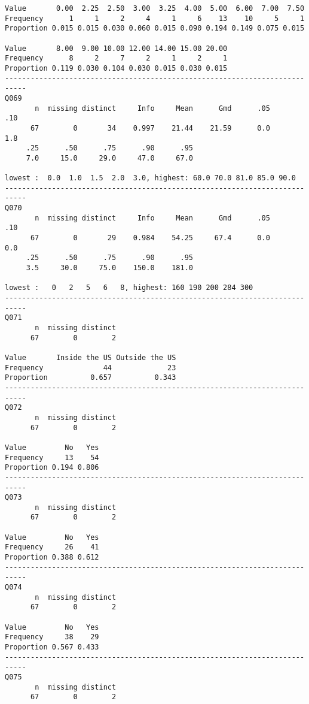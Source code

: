 \documentclass[]{article}
\begin{document}
\begin{verbatim}
Value       0.00  2.25  2.50  3.00  3.25  4.00  5.00  6.00  7.00  7.50
Frequency      1     1     2     4     1     6    13    10     5     1
Proportion 0.015 0.015 0.030 0.060 0.015 0.090 0.194 0.149 0.075 0.015
                                                    
Value       8.00  9.00 10.00 12.00 14.00 15.00 20.00
Frequency      8     2     7     2     1     2     1
Proportion 0.119 0.030 0.104 0.030 0.015 0.030 0.015
---------------------------------------------------------------------------
Q069 
       n  missing distinct     Info     Mean      Gmd      .05      .10 
      67        0       34    0.997    21.44    21.59      0.0      1.8 
     .25      .50      .75      .90      .95 
     7.0     15.0     29.0     47.0     67.0 

lowest :  0.0  1.0  1.5  2.0  3.0, highest: 60.0 70.0 81.0 85.0 90.0
---------------------------------------------------------------------------
Q070 
       n  missing distinct     Info     Mean      Gmd      .05      .10 
      67        0       29    0.984    54.25     67.4      0.0      0.0 
     .25      .50      .75      .90      .95 
     3.5     30.0     75.0    150.0    181.0 

lowest :   0   2   5   6   8, highest: 160 190 200 284 300
---------------------------------------------------------------------------
Q071 
       n  missing distinct 
      67        0        2 
                                        
Value       Inside the US Outside the US
Frequency              44             23
Proportion          0.657          0.343
---------------------------------------------------------------------------
Q072 
       n  missing distinct 
      67        0        2 
                      
Value         No   Yes
Frequency     13    54
Proportion 0.194 0.806
---------------------------------------------------------------------------
Q073 
       n  missing distinct 
      67        0        2 
                      
Value         No   Yes
Frequency     26    41
Proportion 0.388 0.612
---------------------------------------------------------------------------
Q074 
       n  missing distinct 
      67        0        2 
                      
Value         No   Yes
Frequency     38    29
Proportion 0.567 0.433
---------------------------------------------------------------------------
Q075 
       n  missing distinct 
      67        0        2 
                      

\end{verbatim}
\end{document}
